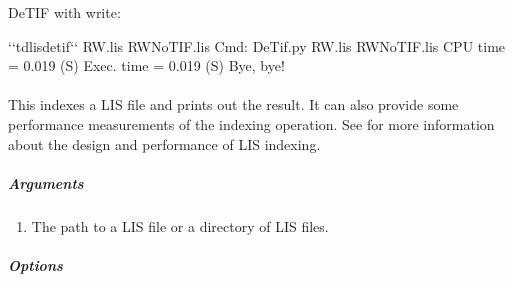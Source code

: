 \documentclass[letterpaper,10pt,english]{sphinxmanual}
\begin{document}
DeTIF with write:

\begin{sphinxVerbatim}[commandchars=\\\{\}]
\PYGZdl{} {}`{}`tdlisdetif{}`{}` RW.lis RW\PYGZus{}No\PYGZus{}TIF.lis
Cmd: DeTif.py RW.lis RW\PYGZus{}No\PYGZus{}TIF.lis
  CPU time =    0.019 (S)
Exec. time =    0.019 (S)
Bye, bye!
\end{sphinxVerbatim}


\paragraph{}
\label{\detokenize{cmd_line_tools/LIS_cmd_line_tools:tdlisindex}}
This indexes a LIS file and prints out the result. It can also provide some performance measurements of the indexing operation. See {\hyperref[\detokenize{tech/LIS_indexing:totaldepth-tech-indexing}]{}} for more information about the design and performance of LIS indexing.


\subparagraph{Arguments}
\label{\detokenize{cmd_line_tools/LIS_cmd_line_tools:id19}}\begin{enumerate}
\item {} 
The path to a LIS file or a directory of LIS files.

\end{enumerate}


\subparagraph{Options}
\label{\detokenize{cmd_line_tools/LIS_cmd_line_tools:id20}}
\end{document}
